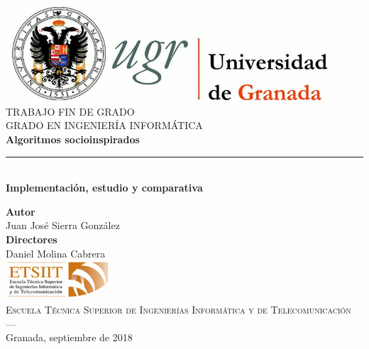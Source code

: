 \begin{titlepage}
 
 
\newlength{\centeroffset}
\setlength{\centeroffset}{-0.5\oddsidemargin}
\addtolength{\centeroffset}{0.5\evensidemargin}
\thispagestyle{empty}

\noindent\hspace*{\centeroffset}\begin{minipage}{\textwidth}

\centering
\includegraphics[width=0.9\textwidth]{imagenes/logo_ugr.jpg}\\[1.4cm]

\textsc{ \Large TRABAJO FIN DE GRADO\\[0.2cm]}
\textsc{GRADO EN INGENIERÍA INFORMÁTICA}\\[1cm]
% 
{\Huge\bfseries Algoritmos socioinspirados\\
}
\noindent\rule[-1ex]{\textwidth}{3pt}\\[3.5ex]
{\large\bfseries Implementación, estudio y comparativa}
\end{minipage}

\vspace{2.5cm}
\noindent\hspace*{\centeroffset}\begin{minipage}{\textwidth}
\centering

\textbf{Autor}\\ {Juan José Sierra González}\\[2.5ex]
\textbf{Directores}\\
{Daniel Molina Cabrera}\\[2cm]
\includegraphics[width=0.3\textwidth]{imagenes/etsiit_logo.png}\\[0.1cm]
\textsc{Escuela Técnica Superior de Ingenierías Informática y de Telecomunicación}\\
\textsc{---}\\
Granada, septiembre de 2018
\end{minipage}
\end{titlepage}


